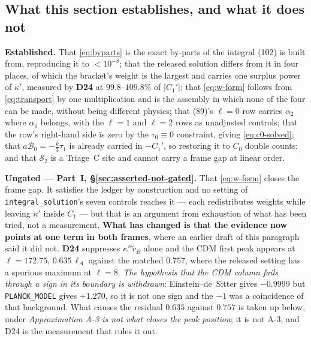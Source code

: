 \subsection{What this section establishes, and what it does not}

\textbf{Established.} That \eqref{eq:byparts} is the exact by-parts of the
integral (102) is built from, reproducing it to $<10^{-8}$; that the released
solution differs from it in four places, of which the bracket's weight is the
largest and carries one surplus power of $\kappa'$, measured by \textbf{D24}
at $99.8$--$109.8\%$ of $|C_1'|$; that \eqref{eq:w-form} follows from
\eqref{eq:transport} by one multiplication and is the assembly in which none
of the four can be made, without being different physics; that (89)'s
$\ell=0$ row carries $\alpha_2$ where $\alpha_0$ belongs, with the $\ell=1$ and
$\ell=2$ rows as unadjusted controls; that the row's right-hand side is zero by
the $\tau_0\equiv0$ constraint, giving \eqref{eq:c0-solved}; that
$a\mathcal B_0=-\tfrac k3\tau_1$ is already carried in $-C_1'$, so restoring it
to $C_0$ double counts; and that $\mathcal S_2$ is a Triage~C site and cannot
carry a frame gap at linear order.

\textbf{Ungated --- Part~I, \S\ref{sec:asserted-not-gated}.} That \eqref{eq:w-form} closes the frame gap. It
satisfies the ledger by construction and no setting of
\texttt{integral\_solution}'s seven controls reaches it --- each redistributes
weights while leaving $\kappa'$ inside $C_1$ --- but that is an argument from
exhaustion of what has been tried, not a measurement. \textbf{What has
changed is that the evidence now points at one term in both frames}, where an
earlier draft of this paragraph said it did not. \textbf{D24} suppresses
$\kappa''\tilde v_B$ alone and the CDM first peak appears at $\ell=172.75$,
$0.635\,\ell_A$ against the matched $0.757$, where the released setting has a
spurious maximum at $\ell=8$. \emph{The hypothesis that the CDM column fails
through a sign in its boundary is withdrawn}: Einstein--de~Sitter gives
$-0.9999$ but \texttt{PLANCK\_MODEL} gives $+1.270$, so it is not one sign and
the $-1$ was a coincidence of that background. What causes the residual
$0.635$ against $0.757$ is taken up below, under \emph{Approximation A-3 is
not what closes the peak position}; it is not A-3, and D24 is the measurement
that rules it out.

